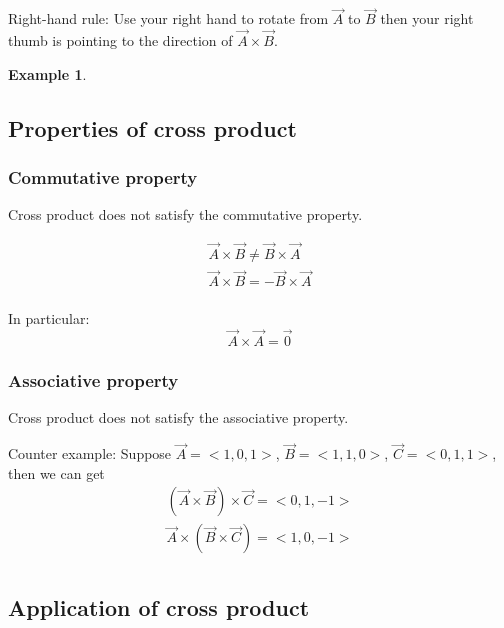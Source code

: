 \documentclass{article}
\newtheorem{example}{Example}
\begin{document}
Right-hand rule: Use your right hand to rotate from $\vec{A}$ to $\vec{B}$ then
your right thumb is pointing to the direction of $\vec{A} \times \vec{B}$.

\begin{example}
  
\end{example}

\subsection{Properties of cross product}

\subsubsection{Commutative property}
Cross product does not satisfy the commutative property.

\begin{gather*}
  \vec{A} \times \vec{B} \neq \vec{B} \times \vec{A} \\
  \vec{A} \times \vec{B} = - \vec{B} \times \vec{A} \\
\end{gather*}

In particular:
\[
  \vec{A} \times \vec{A} = \vec{0}
\]

\subsubsection{Associative property}
Cross product does not satisfy the associative property.

Counter example: Suppose $\vec{A} = <1, 0, 1>$, $\vec{B} = <1, 1, 0>$,
$\vec{C} = <0, 1, 1>$, then we can get
\begin{gather*}
  (\vec{A} \times \vec{B}) \times \vec{C} = <0, 1, -1> \\
  \vec{A} \times (\vec{B} \times \vec{C}) = <1, 0, -1> \\
\end{gather*}

\subsection{Application of cross product}
\end{document}
